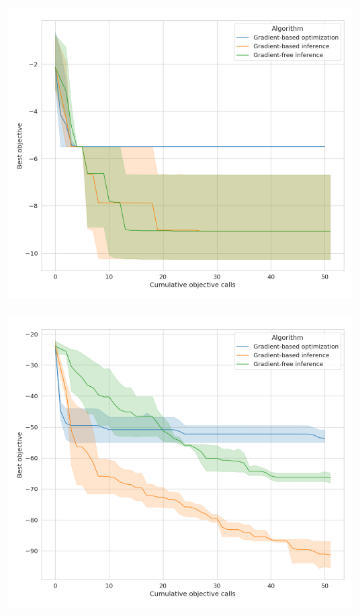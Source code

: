 \begin{figure}[tb]
    \centering
    \begin{subfigure}[t]{0.24\linewidth}
        \centering
        \includegraphics[width=\linewidth]{images/ch6/ballistic_1.png}
    \end{subfigure}
    \begin{subfigure}[t]{0.24\linewidth}
        \centering
        \includegraphics[width=\linewidth]{images/ch6/ballistic_10.png}
    \end{subfigure}

\end{figure}
